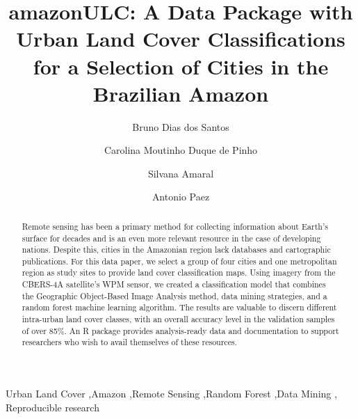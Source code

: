 \documentclass[preprint, 3p,
authoryear]{elsarticle} %
\begin{document}
\begin{frontmatter}

  \title{amazonULC: A Data Package with Urban Land Cover Classifications
for a Selection of Cities in the Brazilian Amazon}
    \author[National Institute for Space Research (INPE)]{Bruno Dias dos
Santos%
  }
    \author[Federal University of ABC (UFABC)]{Carolina Moutinho Duque
de Pinho%
  }
    \author[National Institute for Space Research (INPE)]{Silvana
Amaral%
  }
    \author[McMaster University]{Antonio Paez%
  }
  
  \begin{abstract}
  Remote sensing has been a primary method for collecting information
  about Earth's surface for decades and is an even more relevant
  resource in the case of developing nations. Despite this, cities in
  the Amazonian region lack databases and cartographic publications. For
  this data paper, we select a group of four cities and one metropolitan
  region as study sites to provide land cover classification maps. Using
  imagery from the CBERS-4A satellite's WPM sensor, we created a
  classification model that combines the Geographic Object-Based Image
  Analysis method, data mining strategies, and a random forest machine
  learning algorithm. The results are valuable to discern different
  intra-urban land cover classes, with an overall accuracy level in the
  validation samples of over 85\%. An R package provides analysis-ready
  data and documentation to support researchers who wish to avail
  themselves of these resources.
  \end{abstract}
    \begin{keyword}
    Urban Land Cover \sep Amazon \sep Remote Sensing \sep Random
Forest \sep Data Mining \sep 
    Reproducible research
  \end{keyword}
  
 \end{frontmatter}
\end{document}
